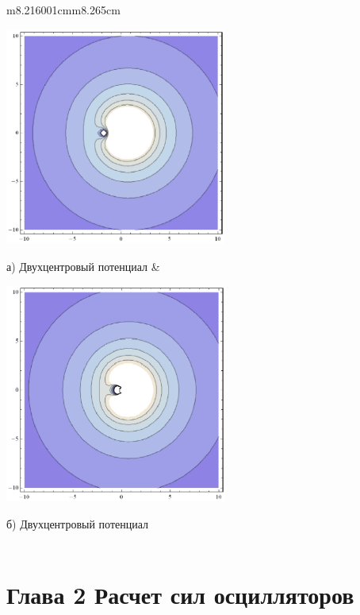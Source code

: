 \begin{flushleft}
\tablefirsthead{}
\tablehead{}
\tabletail{}
\tablelasttail{}
\begin{supertabular}{m{8.216001cm}m{8.265cm}}
{\centering   %
\includegraphics[width=7.265cm,height=7.165cm]{chervinskaya-16.eps}
 \par}
\centering а) Двухцентровый
потенциал &
{\centering   %
\includegraphics[width=7.303cm,height=7.2cm]{chervinskaya-17.eps}
 \par}
\centering\arraybslash б)
Двухцентровый
потенциал\\
\\
\end{supertabular}
\end{flushleft}

\bigskip


\bigskip


\bigskip

\clearpage\section{Глава 2 Расчет
сил осцилляторов}
